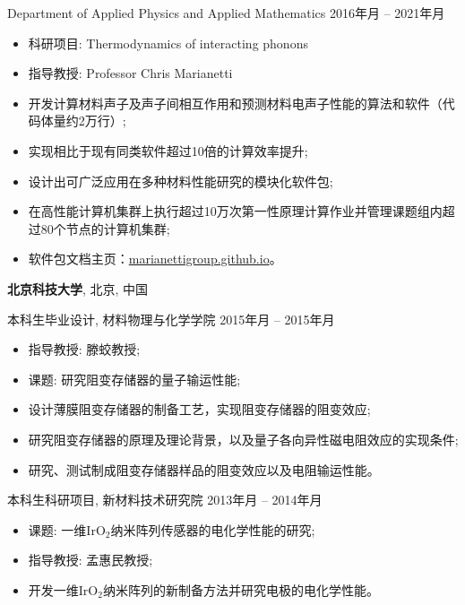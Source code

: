 \documentclass[
  a4paper,
  12pt
]{cv}
\renewcommand{\DatestampYMD}[3]{\mbox{#1年\number#2月}}
\begin{document}
Department of Applied Physics and Applied Mathematics
\hfill
\DatestampYMD{2016}{05}{17} --
\DatestampYMD{2021}{10}{20}
\begin{itemize}
\item 科研项目: Thermodynamics of interacting phonons
\item 指导教授: Professor Chris Marianetti
\item 开发计算材料声子及声子间相互作用和预测材料电声子性能的算法和软件（代码体量约2万行）;
\item 实现相比于现有同类软件超过10倍的计算效率提升;
\item 设计出可广泛应用在多种材料性能研究的模块化软件包;
\item 在高性能计算机集群上执行超过10万次第一性原理计算作业并管理课题组内超过80个节点的计算机集群;
\item 软件包文档主页：\href{https://marianettigroup.github.io}{marianettigroup.github.io}。
\end{itemize}

{\textbf{北京科技大学}},
北京, 中国

本科生毕业设计, 
材料物理与化学学院
\hfill
\DatestampYMD{2015}{02}{01} --
\DatestampYMD{2015}{06}{25}
\begin{itemize}
\item 指导教授: 滕蛟教授;
\item 课题: 研究阻变存储器的量子输运性能; 
\item 设计薄膜阻变存储器的制备工艺，实现阻变存储器的阻变效应; 
\item 研究阻变存储器的原理及理论背景，以及量子各向异性磁电阻效应的实现条件; 
\item 研究、测试制成阻变存储器样品的阻变效应以及电阻输运性能。
\end{itemize}


\vspace{.25em}
本科生科研项目,
新材料技术研究院
\hfill
\DatestampYMD{2013}{10}{05} --
\DatestampYMD{2014}{05}{31}
\begin{itemize}
\item 课题: 一维IrO$_{2}$纳米阵列传感器的电化学性能的研究; 
\item 指导教授: 孟惠民教授; 
\item 开发一维IrO$_{2}$纳米阵列的新制备方法并研究电极的电化学性能。
\end{itemize}
\end{document}
